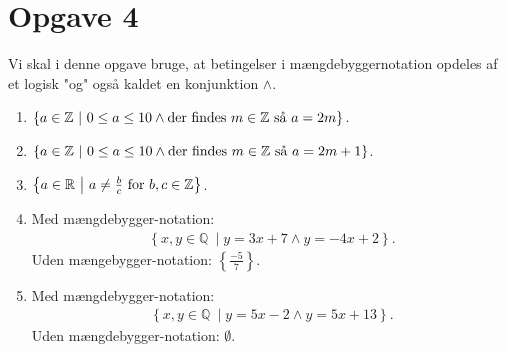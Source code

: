 \section*{Opgave 4}
Vi skal i denne opgave bruge, at betingelser i mængdebyggernotation opdeles af et logisk "og" også kaldet en konjunktion $\wedge$.
\begin{enumerate}[label=\roman*)]
\item $\left\{a \in \mathbb{Z} \ \middle| \ 0 \leq a \leq 10 \wedge \textnormal{der findes } m\in \mathbb{Z} \textnormal{ så } a=2m  \right\}$.
\item $\left\{a \in \mathbb{Z} \ \middle| \ 0 \leq a \leq 10 \wedge \textnormal{der findes } m\in \mathbb{Z} \textnormal{ så } a=2m+1  \right\}$.
\item $\left\{a \in \mathbb{R} \ \middle| \ a \neq \frac{b}{c} \textnormal{ for } b,c \in \mathbb{Z}\right\}$.
\item Med mængdebygger-notation: 
\begin{align*}
\left\{x,y \in \mathbb{Q} \ \middle| y = 3x+7 \wedge y = -4x+2\right\}.
\end{align*}
Uden mængebygger-notation: $\left\{\frac{-5}{7}\right\}$.
\item Med mængdebygger-notation:
\begin{align*}
\left\{x,y \in \mathbb{Q} \ \middle| y = 5x-2 \wedge y = 5x+13\right\}.
\end{align*}
Uden mængdebygger-notation: $\emptyset$.
\end{enumerate}